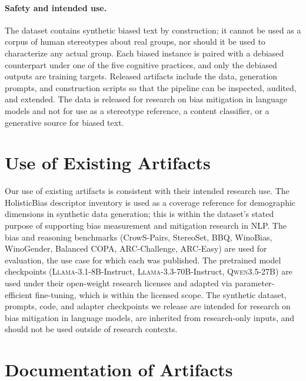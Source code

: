 \documentclass[11pt]{article}
\newcommand{\llama}{\textsc{Llama}}
\newcommand{\qwen}{\textsc{Qwen}}
\begin{document}
\paragraph{Safety and intended use.}
The dataset contains synthetic biased text by construction; it cannot be used as a corpus of human stereotypes about real groups, nor should it be used to characterize any actual group. Each biased instance is paired with a debiased counterpart under one of the five cognitive practices, and only the debiased outputs are training targets. Released artifacts include the data, generation prompts, and construction scripts so that the pipeline can be inspected, audited, and extended. The data is released for research on bias mitigation in language models and not for use as a stereotype reference, a content classifier, or a generative source for biased text.

\section{Use of Existing Artifacts}
\label{app:artifact-use}

Our use of existing artifacts is consistent with their intended research use. The HolisticBias \citep{smith-etal-2022-im} descriptor inventory is used as a coverage reference for demographic dimensions in synthetic data generation; this is within the dataset's stated purpose of supporting bias measurement and mitigation research in NLP. The bias and reasoning benchmarks (CrowS-Pairs, StereoSet, BBQ, WinoBias, WinoGender, Balanced COPA, ARC-Challenge, ARC-Easy) are used for evaluation, the use case for which each was published. The pretrained model checkpoints (\llama{}-3.1-8B-Instruct, \llama{}-3.3-70B-Instruct, \qwen{}3.5-27B) are used under their open-weight research licenses and adapted via parameter-efficient fine-tuning, which is within the licensed scope. The synthetic dataset, prompts, code, and adapter checkpoints we release are intended for research on bias mitigation in language models, are inherited from research-only inputs, and should not be used outside of research contexts.

\section{Documentation of Artifacts}
\label{app:artifact-docs}
\end{document}
